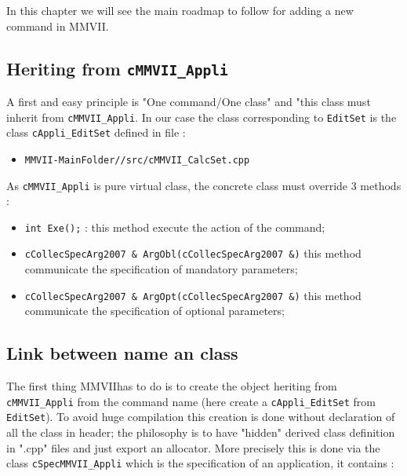 \documentclass[a4paper]{book}
\newcommand{\PPP}{MMVII}
\newcommand{\MMVIDIR}{{\tt MMVII-MainFolder/}}
\begin{document}
{In this chapter we will see the main roadmap to follow for
adding a new command in \PPP.



\subsection{Heriting from  {\tt cMMVII\_Appli}}

A first and easy principle is "One command/One class" and  "this class must
inherit from {\tt cMMVII\_Appli}.
In our case the class corresponding to {\tt EditSet} is the class {\tt cAppli\_EditSet}
defined in file :

\begin{itemize}
   \item  {\tt \MMVIDIR/src/cMMVII\_CalcSet.cpp}
\end{itemize}
As {\tt cMMVII\_Appli} is pure virtual class, the concrete class must override
$3$ methods :

\begin{itemize}
   \item {\tt int Exe();} : this method execute the action of the command;

   \item {\tt cCollecSpecArg2007 \& ArgObl(cCollecSpecArg2007 \&)} this method communicate the specification
         of mandatory parameters;

   \item {\tt cCollecSpecArg2007 \& ArgOpt(cCollecSpecArg2007 \&)} this method communicate the specification
         of optional parameters;
\end{itemize}



\subsection{Link between name an class}

The first thing \PPP has to do is to create the object heriting
from {\tt cMMVII\_Appli} from the command name (here create a {\tt cAppli\_EditSet}
from  {\tt EditSet}). To avoid huge compilation this creation is done
without declaration of all the class in header; the philosophy is to have
"hidden"  derived class definition in ".cpp" files  and just export an allocator.
More precisely this is done via the class {\tt cSpecMMVII\_Appli} which is
the specification of an application, it contains :

}
\end{document}
